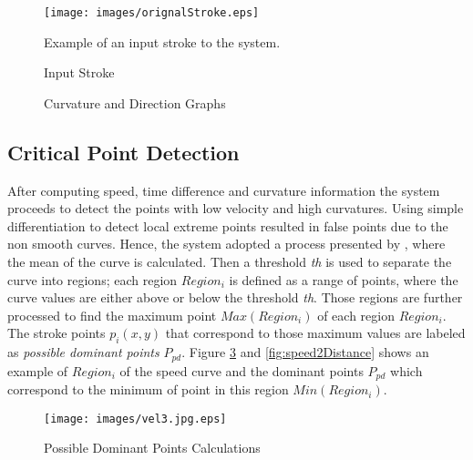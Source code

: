 \begin{figure}[]
	\centering
		\texttt{[image: images/orignalStroke.eps]}
	\caption{Input Stroke} Example of an input stroke to the system. 
	\label{fig:AnotherorignalStroke}
\end{figure}

\begin{figure}[]
	\centering

		
		
	
	\caption{Curvature and Direction Graphs}%
	
	\label{fig:curvatures}
\end{figure}


\subsection{Critical Point Detection}
\label{sec:CriticalPointDetection}
After computing speed, time difference and curvature information the system proceeds to detect the points with low velocity and high curvatures. Using simple differentiation to detect local extreme points resulted in false points due to the non smooth curves. Hence, the system adopted a process presented by \cite{earlyprocess}, where the mean of the curve is calculated. Then a threshold \textit{th} is used to separate the curve into regions; each region $Region_i$ is defined as a range of points, where the curve values are either above or below the threshold \textit{th}. Those regions are further processed to find the maximum point $Max(Region_i)$ of each region $Region_i$. The stroke points $p_i(x,y)$ that correspond to those maximum values are labeled as \textit{possible dominant points} $P_{pd}$. Figure \ref{fig:MaxRegioi} and \ref{fig:speed2Distance} shows an example of $Region_i$ of the speed curve and the dominant points $P_{pd}$ which correspond to the minimum of point in this region $Min(Region_i)$.  %
\begin{figure}
	\centering
		\texttt{[image: images/vel3.jpg.eps]}
	\caption{Possible Dominant Points Calculations}
	\label{fig:MaxRegioi}
\end{figure}

